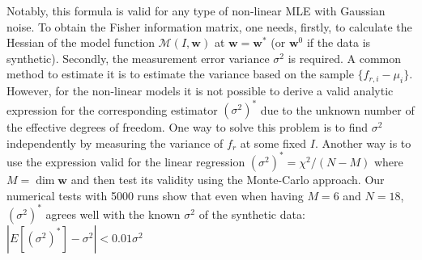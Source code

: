\documentclass[%
 aip,
 draft,
 amsmath,amssymb,
 reprint,%
]{revtex4-1}
\begin{document}
Notably, this formula is valid for any type of non-linear MLE with Gaussian noise. To obtain the Fisher information matrix, one needs, firstly, to calculate the Hessian of the model function $\mathcal{M}(I, \mathbf{w})$ at $\mathbf{w}=\mathbf{w}^*$ (or $ \mathbf{w}^0 $ if the data is synthetic). Secondly, the measurement error variance $\sigma^2$ is required. A common method to estimate it is to estimate the variance based on the sample $\{f_{r,i} - \mu_i\}$. However, for the non-linear models it is not possible\cite{ye1998, andrae2010} to derive a valid analytic expression for the corresponding estimator $(\sigma^2)^*$ due to the unknown number of the effective degrees of freedom. One way to solve this problem is to find $\sigma^2$ independently by measuring the variance of $f_r$ at some fixed $I$. Another way is to use the expression valid for the linear regression
$(\sigma^{2})^* = \chi^2/(N-M)$ where $M = \dim \mathbf{w}$ and then test its validity using the Monte-Carlo approach. Our numerical tests with 5000 runs show that even when having $M=6$ and $N=18$, $(\sigma^{2})^*$ agrees well with the known $\sigma^2$ of the synthetic data:  $|E[(\sigma^{2})^*] - \sigma^2|< 0.01 \sigma^2$
\end{document}
